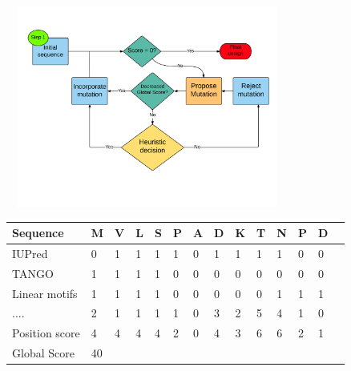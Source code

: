 \documentclass{beamer}
\begin{document}
\begin{frame}[plain]
\vspace{-0.5\baselineskip}
\begin{adjustwidth}{-2.5em}{-2.5em}
\includegraphics[width=350px,height=250px]{../img/patenaReduced.png} 
\end{adjustwidth}
\end{frame}













\begin{frame}
 \begin{tabular}{llllllllllllll} 
\hline
Sequence & \textbf{M} & \textbf{V} & \textbf{L} & \textbf{S} & \textbf{P} & \textbf{A} & \textbf{D} & \textbf{K} & \textbf{T} & \textbf{N} & \textbf{P} & \textbf{D} \\ \hline \hline
 
IUPred                 & 0 & 1 & 1 & 1 & 1 & 0 & 1 & 1 & 1 & 1 & 0 & 0\\ \hline  
TANGO 		       & 1 & 1 & 1 & 1 & 0 & 0 & 0 & 0 & 0 & 0 & 0 & 0\\ \hline  
Linear motifs          & 1 & 1 & 1 & 1 & 0 & 0 & 0 & 0 & 0 & 1 & 1 & 1\\ \hline  
....                   & 2 & 1 & 1 & 1 & 1 & 0 & 3 & 2 & 5 & 4 & 1 & 0\\ \hline \hline
 
Position score         & 4 & 4 & 4 & 4 & 2 & 0 & 4 & 3 & 6 & 6 & 2 & 1\\ \hline
 
Global Score  & 40 \\ \hline
\end{tabular}
\end{frame}
\end{document}
